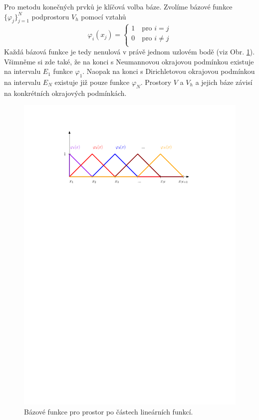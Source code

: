 Pro metodu konečných prvků je klíčová volba báze.
Zvolíme bázové funkce $\{\varphi_j\}_{j=1}^N$ podprostoru $V_h$ pomocí vztahů
\begin{equation*}
      \varphi_i(x_j) = 
        \begin{cases}
          1 \quad \textrm{pro } i=j\\
          0 \quad \textrm{pro } i\neq j\\
        \end{cases}
\end{equation*}
Každá bázová funkce je tedy nenulová v právě jednom uzlovém bodě (viz Obr. \ref{fig:base_1d_lin}). Všimněme si zde také, že na konci s Neumannovou okrajovou podmínkou existuje na intervalu $E_1$ funkce $\varphi_1$. Naopak na konci s Dirichletovou okrajovou podmínkou na intervalu $E_N$ existuje již pouze funkce $\varphi_N$. Prostory $V$ a $V_h$ a jejich báze závisí na konkrétních okrajových podmínkách.
\begin{figure}[h]
\centering
\includegraphics{base_1d_lin_termoska}
\caption{Bázové funkce pro prostor po částech lineárních funkcí.}
\label{fig:base_1d_lin}
\end{figure}

